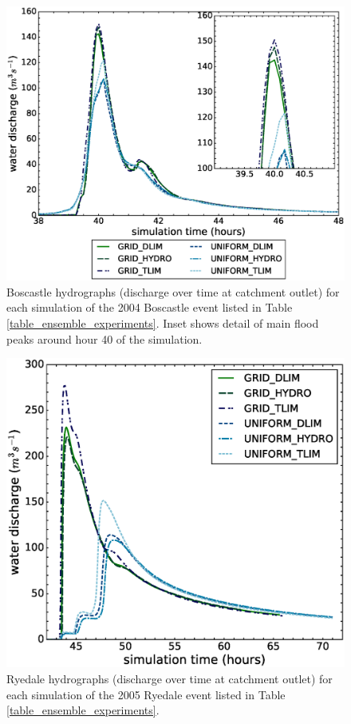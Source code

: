 \begin{figure}[t]
\includegraphics[width=14cm]{chp06_figures_scripts/figure_boscastle_hydrograph_ensemble.eps}
\caption{Boscastle hydrographs (discharge over time at catchment outlet) for each simulation of the 2004 Boscastle event listed in Table \ref{table_ensemble_experiments}. Inset shows detail of main flood peaks around hour 40 of the simulation.}
\label{fig_boscastle_hydrograph_ensemble}
\end{figure}

\begin{figure}[t]
\includegraphics[width=14cm]{chp06_figures_scripts/figure_ryedale_hydrograph_ensemble.eps}
\caption{Ryedale hydrographs (discharge over time at catchment outlet) for each simulation of the 2005 Ryedale event listed in Table \ref{table_ensemble_experiments}.}
\label{fig_ryedale_hydrograph_ensemble}
\end{figure}


